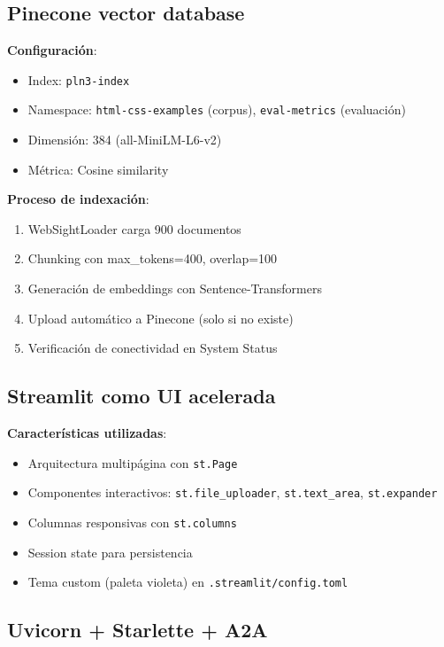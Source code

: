 \documentclass[12pt,a4paper]{article}
\begin{document}
\subsection{Pinecone vector database}

\textbf{Configuración}:
\begin{itemize}
    \item Index: \texttt{pln3-index}
    \item Namespace: \texttt{html-css-examples} (corpus), \texttt{eval-metrics} (evaluación)
    \item Dimensión: 384 (all-MiniLM-L6-v2)
    \item Métrica: Cosine similarity
\end{itemize}

\textbf{Proceso de indexación}:
\begin{enumerate}
    \item WebSightLoader carga 900 documentos
    \item Chunking con max\_tokens=400, overlap=100
    \item Generación de embeddings con Sentence-Transformers
    \item Upload automático a Pinecone (solo si no existe)
    \item Verificación de conectividad en System Status
\end{enumerate}

\subsection{Streamlit como UI acelerada}

\textbf{Características utilizadas}:
\begin{itemize}
    \item Arquitectura multipágina con \texttt{st.Page}
    \item Componentes interactivos: \texttt{st.file\_uploader}, \texttt{st.text\_area}, \texttt{st.expander}
    \item Columnas responsivas con \texttt{st.columns}
    \item Session state para persistencia
    \item Tema custom (paleta violeta) en \texttt{.streamlit/config.toml}
\end{itemize}

\subsection{Uvicorn + Starlette + A2A}
\end{document}
